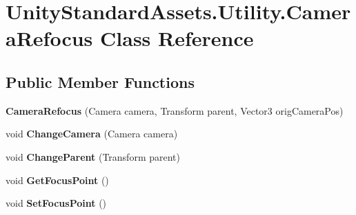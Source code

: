 \hypertarget{class_unity_standard_assets_1_1_utility_1_1_camera_refocus}{}\section{Unity\+Standard\+Assets.\+Utility.\+Camera\+Refocus Class Reference}
\label{class_unity_standard_assets_1_1_utility_1_1_camera_refocus}
\subsection*{Public Member Functions}
\begin{DoxyCompactItemize}
\item 
{\bfseries Camera\+Refocus} (Camera camera, Transform parent, Vector3 orig\+Camera\+Pos)\hypertarget{class_unity_standard_assets_1_1_utility_1_1_camera_refocus_ad18f0defd5d32b13fdfee175e4a5d9ba}{}\label{class_unity_standard_assets_1_1_utility_1_1_camera_refocus_ad18f0defd5d32b13fdfee175e4a5d9ba}

\item 
void {\bfseries Change\+Camera} (Camera camera)\hypertarget{class_unity_standard_assets_1_1_utility_1_1_camera_refocus_a4b06686fe002ec8b589dd5e91b9251e5}{}\label{class_unity_standard_assets_1_1_utility_1_1_camera_refocus_a4b06686fe002ec8b589dd5e91b9251e5}

\item 
void {\bfseries Change\+Parent} (Transform parent)\hypertarget{class_unity_standard_assets_1_1_utility_1_1_camera_refocus_a3d41f2de5bf72909ace12fab7003a2bc}{}\label{class_unity_standard_assets_1_1_utility_1_1_camera_refocus_a3d41f2de5bf72909ace12fab7003a2bc}

\item 
void {\bfseries Get\+Focus\+Point} ()\hypertarget{class_unity_standard_assets_1_1_utility_1_1_camera_refocus_ae40dc3974276cd4f3b39dbfff2c68996}{}\label{class_unity_standard_assets_1_1_utility_1_1_camera_refocus_ae40dc3974276cd4f3b39dbfff2c68996}

\item 
void {\bfseries Set\+Focus\+Point} ()\hypertarget{class_unity_standard_assets_1_1_utility_1_1_camera_refocus_a96116de559e0039593ceda8a97574b6c}{}\label{class_unity_standard_assets_1_1_utility_1_1_camera_refocus_a96116de559e0039593ceda8a97574b6c}

\end{DoxyCompactItemize}
